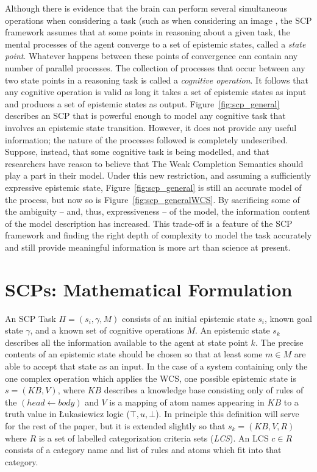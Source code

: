 \documentclass[
11pt, %
english, %
singlespacing, %
headsepline, %
]{MastersDoctoralThesis} %
\begin{document}
Although there is evidence that the brain can perform several simultaneous operations when considering a task (such as when considering an image \citep{sigman2008brain}, the SCP framework assumes that at some points in reasoning about a given task, the mental processes of the agent converge to a set of epistemic states, called a \textit{state point}. Whatever happens between these points of convergence can contain any number of parallel processes. The collection of processes that occur between any two state points in a reasoning task is called a \textit{cognitive operation}. It follows that any cognitive operation is valid as long it takes a set of epistemic states as input and produces a set of epistemic states as output. Figure~\ref{fig:scp_general} describes an SCP that is powerful enough to model any cognitive task that involves an epistemic state transition. However, it does not provide any useful information; the nature of the processes followed is completely undescribed. Suppose, instead, that some cognitive task is being modelled, and that researchers have reason to believe that The Weak Completion Semantics should play a part in their model. Under this new restriction, and assuming a sufficiently expressive epistemic state, Figure~\ref{fig:scp_general} is still an accurate model of the process, but now so is Figure~\ref{fig:scp_generalWCS}. By sacrificing some of the ambiguity -- and, thus, expressiveness -- of the model, the information content of the model description has increased. This trade-off is a feature of the SCP framework and finding the right depth of complexity to model the task accurately and still provide meaningful information is more art than science at present. 

\section{SCPs: Mathematical Formulation}
An SCP Task $\Pi=(s_i, \gamma, M)$ consists of an initial epistemic state $s_i$, known goal state $\gamma$, and a known set of cognitive operations $M$. An epistemic state $s_k$ describes all the information available to the agent at state point $k$. The precise contents of an epistemic state should be chosen so that at least some $m \in M$ are able to accept that state as an input. In the case of a system containing only the one complex operation which applies the WCS, one possible epistemic state is $s=(KB,V)$, where $KB$ describes a knowledge base consisting only of rules of the $(head \leftarrow body)$ and $V$ is a mapping of atom names appearing in $KB$ to a truth value in \L ukasiewicz logic ($\top,u, \bot$). In principle this definition will serve for the rest of the paper, but it is extended slightly so that $s_k = (KB,V,R)$ where $R$ is a set of labelled categorization criteria sets (\textit{LCS}). An LCS $ c \in R$ consists of a category name and list of rules and atoms which fit into that category.
\end{document}
